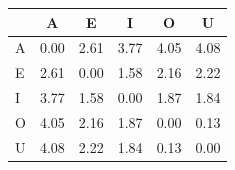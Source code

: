 \begin{tabular}{lccccc}
\toprule
\rowcolor{col01}
 & A & E & I & O & U \\
\midrule
A & 0.00 & 2.61 & 3.77 & 4.05 & 4.08 \\
E & 2.61 & 0.00 & 1.58 & 2.16 & 2.22 \\
I & 3.77 & 1.58 & 0.00 & 1.87 & 1.84 \\
O & 4.05 & 2.16 & 1.87 & 0.00 & 0.13 \\
U & 4.08 & 2.22 & 1.84 & 0.13 & 0.00 \\
\bottomrule
\end{tabular}
